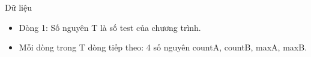 Dữ liệu  
\begin{itemize}
	\item     Dòng 1: Số nguyên T là số test của chương trình.   
	\item     Mỗi dòng trong T dòng tiếp theo: 4 số nguyên countA, countB, maxA, maxB.   
\end{itemize}